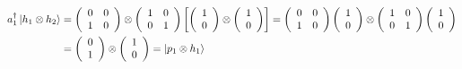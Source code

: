 \documentclass[aps,preprint]{revtex4}%
\begin{document}
\begin{align}
a_{1}^{\dagger}\left\vert h_{1}\otimes h_{2}\right\rangle  &  =\left(
\begin{array}
[c]{cc}%
0 & 0\\
1 & 0
\end{array}
\right)  \otimes\left(
\begin{array}
[c]{cc}%
1 & 0\\
0 & 1
\end{array}
\right)  \left[  \left(
\begin{array}
[c]{c}%
1\\
0
\end{array}
\right)  \otimes\left(
\begin{array}
[c]{c}%
1\\
0
\end{array}
\right)  \right]  =\left(
\begin{array}
[c]{cc}%
0 & 0\\
1 & 0
\end{array}
\right)  \left(
\begin{array}
[c]{c}%
1\\
0
\end{array}
\right)  \otimes\left(
\begin{array}
[c]{cc}%
1 & 0\\
0 & 1
\end{array}
\right)  \left(
\begin{array}
[c]{c}%
1\\
0
\end{array}
\right) \\
&  =\left(
\begin{array}
[c]{c}%
0\\
1
\end{array}
\right)  \otimes\left(
\begin{array}
[c]{c}%
1\\
0
\end{array}
\right)  =\left\vert p_{1}\otimes h_{1}\right\rangle
\end{align}%
\end{document}
